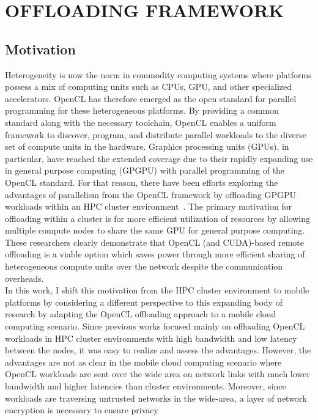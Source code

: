\chapter{OFFLOADING FRAMEWORK}
\label{chap:offloading}
%
\section{Motivation}
\label{offloading:motivation}
%
Heterogeneity is now the norm in commodity computing systems where
platforms possess a mix of computing units such as CPUs, GPU, and other
specialized accelerators.
%
OpenCL has therefore emerged as the open standard for parallel programming
for these heterogeneous platforms.
%
By providing a common standard along with the necessary toolchain, OpenCL
enables a uniform framework to discover, program, and distribute parallel
workloads to the diverse set of compute units in the hardware.
%
Graphics processing units (GPUs), in particular, have reached the extended
coverage due to their rapidly expanding use in general purpose computing
(GPGPU) with parallel programming of the OpenCL standard.
%
For that reason, there have been efforts exploring the advantages of
parallelism from the OpenCL framework by offloading GPGPU workloads
within an HPC cluster environment~\cite{rcuda,vocl}.
%
The primary motivation for offloading within a cluster is for more efficient
utilization of resources by allowing multiple compute nodes to share the same
GPU for general purpose computing.
%
These researchers clearly demonstrate that OpenCL (and CUDA)-based
remote offloading is a viable option which saves power through more efficient
sharing of heterogeneous compute units over the network despite the
communication overheads.\\
%
In this work, I shift this motivation from the HPC cluster environment
to mobile platforms by considering a different perspective to this
expanding body of research by adapting the OpenCL offloading approach to
a mobile cloud computing scenario.
%
Since previous works focused mainly on offloading OpenCL workloads in
HPC cluster environments with high bandwidth and low latency between the
nodes, it was easy to realize and assess the advantages.
%
However, the advantages are not as clear in the mobile cloud computing
scenario where OpenCL workloads are sent over the wide area on
network links with much lower bandwidth and higher latencies than 
cluster environments.
%
Moreover, since workloads are traversing untrusted networks in the
wide-area, a layer of network encryption is necessary to ensure privacy
